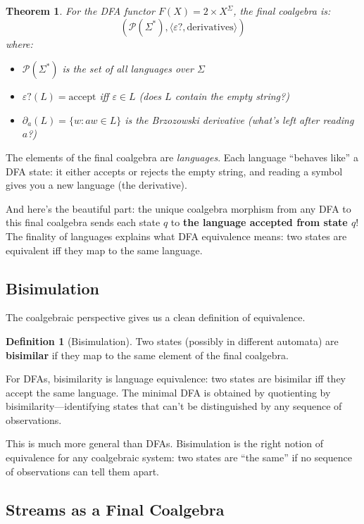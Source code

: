 \documentclass[11pt]{article}
\theoremstyle{definition}
\newtheorem{definition}{Definition}[section]
\theoremstyle{plain}
\newtheorem{theorem}{Theorem}[section]
\theoremstyle{remark}
\begin{document}
\begin{theorem}
For the DFA functor $F(X) = 2 \times X^\Sigma$, the final coalgebra is:
\[
(\mathcal{P}(\Sigma^*), \langle \varepsilon?, \text{derivatives} \rangle)
\]
where:
\begin{itemize}
  \item $\mathcal{P}(\Sigma^*)$ is the set of \emph{all} languages over $\Sigma$
  \item $\varepsilon?(L) = \text{accept}$ iff $\varepsilon \in L$ (does $L$ contain the empty string?)
  \item $\partial_a(L) = \{w : aw \in L\}$ is the Brzozowski derivative (what's left after reading $a$?)
\end{itemize}
\end{theorem}

The elements of the final coalgebra are \emph{languages}. Each language ``behaves like'' a DFA state: it either accepts or rejects the empty string, and reading a symbol gives you a new language (the derivative).

And here's the beautiful part: the unique coalgebra morphism from any DFA to this final coalgebra sends each state $q$ to \textbf{the language accepted from state $q$}! The finality of languages explains what DFA equivalence means: two states are equivalent iff they map to the same language.

\subsection{Bisimulation}

The coalgebraic perspective gives us a clean definition of equivalence.

\begin{definition}[Bisimulation]
Two states (possibly in different automata) are \textbf{bisimilar} if they map to the same element of the final coalgebra.
\end{definition}

For DFAs, bisimilarity is language equivalence: two states are bisimilar iff they accept the same language. The minimal DFA is obtained by quotienting by bisimilarity---identifying states that can't be distinguished by any sequence of observations.

This is much more general than DFAs. Bisimulation is the right notion of equivalence for any coalgebraic system: two states are ``the same'' if no sequence of observations can tell them apart.

\subsection{Streams as a Final Coalgebra}
\end{document}
